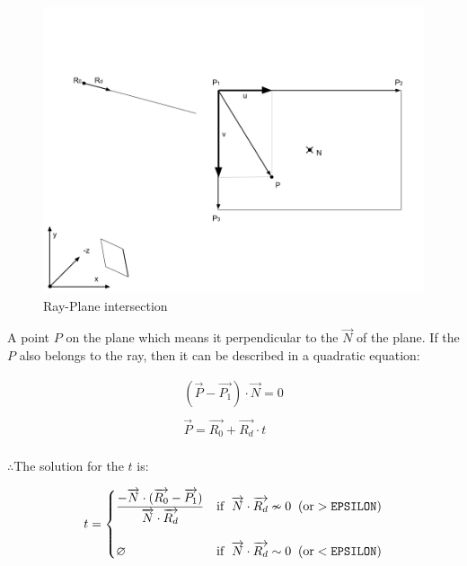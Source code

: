 \begin{figure}[H]
\caption{Ray-Plane intersection}
\label{fig:ray-plane}
\centering
\includegraphics[width=\linewidth]{Figures/ray-plane-intersection.png}
\decoRule
\end{figure}

A point $P$ on the plane which means it perpendicular to the $\overrightarrow{N}$ of the plane. If the $P$ also belongs to the ray, then it can be described in a quadratic equation:

\begin{equation}
\label{equ:ray-plane-intersection}
\begin{array}{lr}
(\overrightarrow{P} - \overrightarrow{P_1}) \cdot \overrightarrow{N} = 0\\\\
\overrightarrow{P} = \overrightarrow{R_0} + \overrightarrow{R_d} \cdot t\\
\end{array}
\end{equation}

$\therefore$\;\;\;\;The solution for the $t$ is:

\[
t =
\begin{cases}
\dfrac{-\overrightarrow{N} \cdot (\overrightarrow{R_0} - \overrightarrow{P_1})}{\overrightarrow{N} \cdot \overrightarrow{R_d}} & \text{if }\;\overrightarrow{N} \cdot \overrightarrow{R_d} \nsim 0\;\;(\text{or} > \texttt{EPSILON})\\\\
\varnothing & \text{if }\;\overrightarrow{N} \cdot \overrightarrow{R_d} \sim 0\;\;(\text{or} < \texttt{EPSILON})\\
\end{cases}
\]

